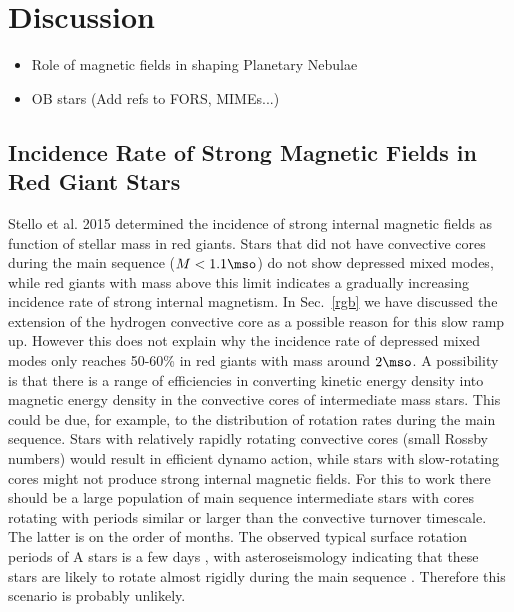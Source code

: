 \section{Discussion}
\begin{itemize}
\item Role of magnetic fields in shaping Planetary Nebulae
\item OB stars (Add refs to FORS, MIMEs...)
\end{itemize}

\subsection{Incidence Rate of Strong Magnetic Fields in Red Giant Stars}
Stello et al. 2015 determined the incidence of strong internal magnetic fields as function of stellar mass in red giants. Stars that did not have convective cores during the main sequence ($M<1.1\mso$) do not show depressed mixed modes, while red giants with mass above this limit indicates a gradually increasing incidence rate of strong internal magnetism.    In Sec.~\ref{rgb} we have discussed the extension of the hydrogen convective core as a possible reason for this slow ramp up. However this does not explain why the incidence rate of depressed mixed modes only reaches 50-60\% in red giants with mass around $2\mso$.
A possibility is that there is a range of efficiencies in converting kinetic energy density into magnetic energy density in the convective cores of intermediate mass stars. This could be due, for example, to the distribution of rotation rates during the main sequence. Stars with relatively rapidly rotating convective cores (small Rossby numbers) would result in efficient dynamo action, while stars with slow-rotating cores might not produce strong internal magnetic fields. For this to work there should be a large population of main sequence intermediate stars with cores rotating with periods similar or larger than the convective turnover timescale. The latter is on the order of months. The  observed typical surface rotation periods of A stars is a few days \citep{Zorec_2012}, with  asteroseismology indicating that these stars are likely to rotate almost rigidly during the main sequence \citep[e.g.][]{Benomar_2015}. Therefore this scenario is probably unlikely.

